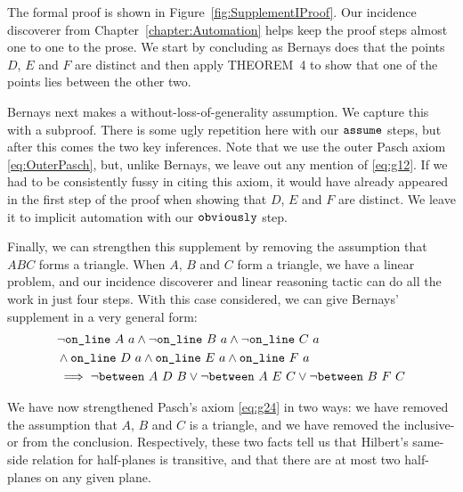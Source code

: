 The formal proof is shown in Figure~\ref{fig:SupplementIProof}. Our incidence discoverer from Chapter~\ref{chapter:Automation} helps keep the proof steps almost one to one to the prose. We start by concluding as Bernays does that the points $D$, $E$ and $F$ are distinct and then apply THEOREM~4 to show that one of the points lies between the other two.

Bernays next makes a without-loss-of-generality assumption. We capture this with a subproof. There is some ugly repetition here with our $\texttt{assume}$ steps, but after this comes the two key inferences. Note that we use the outer Pasch axiom \eqref{eq:OuterPasch}, but, unlike Bernays, we leave out any mention of \eqref{eq:g12}. If we had to be consistently fussy in citing this axiom, it would have already appeared in the first step of the proof when showing that $D$, $E$ and $F$ are distinct. We leave it to implicit automation with our $\texttt{obviously}$ step.

Finally, we can strengthen this supplement by removing the assumption that $ABC$ forms a triangle. When $A$, $B$ and $C$ form a triangle, we have a linear problem, and our incidence discoverer and linear reasoning tactic can do all the work in just four steps. With this case considered, we can give Bernays' supplement in a very general form:
\begin{equation}\label{eq:SupplementI}
  \begin{split}
    &\neg\texttt{on\_line}\ A\ a \wedge \neg\texttt{on\_line}\ B\ a \wedge \neg\texttt{on\_line}\ C\ a\\
    &\wedge \texttt{on\_line}\ D\ a \wedge \texttt{on\_line}\ E\ a \wedge \texttt{on\_line}\ F\ a\\
    &\implies \neg\texttt{between}\ A\ D\ B \vee \neg\texttt{between}\ A\ E\ C \vee \neg\texttt{between}\ B\ F\ C
  \end{split}
\end{equation}

We have now strengthened Pasch's axiom \eqref{eq:g24} in two ways: we have removed the assumption that $A$, $B$ and $C$ is a triangle, and we have removed the inclusive-or from the conclusion. Respectively, these two facts tell us that Hilbert's same-side relation for half-planes is transitive, and that there are at most two half-planes on any given plane.

